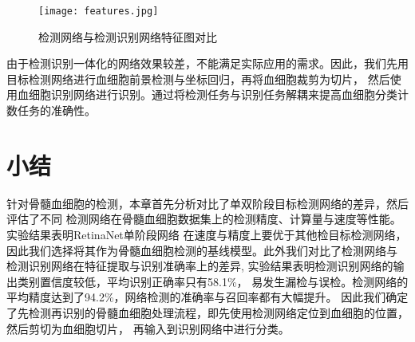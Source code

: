 \begin{figure}[htbp]                     
  \centering                      
  \texttt{[image: features.jpg]}                      
  \caption{检测网络与检测识别网络特征图对比}                      
  \label{fig:feature}       
\end{figure}   

 由于检测识别一体化的网络效果较差，不能满足实际应用的需求。因此，我们先用目标检测网络进行血细胞前景检测与坐标回归，再将血细胞裁剪为切片，
 然后使用血细胞识别网络进行识别。通过将检测任务与识别任务解耦来提高血细胞分类计数任务的准确性。

\section{小结}

针对骨髓血细胞的检测，本章首先分析对比了单双阶段目标检测网络的差异，然后评估了不同
检测网络在骨髓血细胞数据集上的检测精度、计算量与速度等性能。实验结果表明RetinaNet单阶段网络
在速度与精度上要优于其他检目标检测网络，因此我们选择将其作为骨髓血细胞检测的基线模型。此外我们对比了检测网络与
检测识别网络在特征提取与识别准确率上的差异, 实验结果表明检测识别网络的输出类别置信度较低，平均识别正确率只有58.1\%，
易发生漏检与误检。检测网络的平均精度达到了94.2\%，网络检测的准确率与召回率都有大幅提升。
因此我们确定了先检测再识别的骨髓血细胞处理流程，即先使用检测网络定位到血细胞的位置，然后剪切为血细胞切片，
再输入到识别网络中进行分类。



